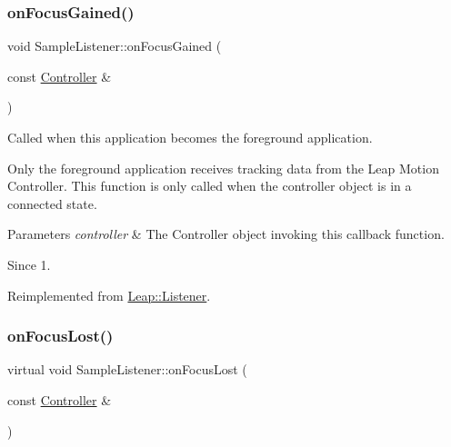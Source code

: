 \subsubsection{\texorpdfstring{on\+Focus\+Gained()}{onFocusGained()}\hspace{0.1cm}{\footnotesize\ttfamily [2/2]}}
{\footnotesize\ttfamily void Sample\+Listener\+::on\+Focus\+Gained (\begin{DoxyParamCaption}\item[{const \hyperlink{class_leap_1_1_controller}{Controller} \&}]{ }\end{DoxyParamCaption})\hspace{0.3cm}{\ttfamily [virtual]}}

Called when this application becomes the foreground application.

Only the foreground application receives tracking data from the Leap Motion Controller. This function is only called when the controller object is in a connected state.


\begin{DoxyCodeInclude}
\end{DoxyCodeInclude}



\begin{DoxyParams}{Parameters}
{\em controller} & The Controller object invoking this callback function. \\
\hline
\end{DoxyParams}
\begin{DoxySince}{Since}
1. 
\end{DoxySince}


Reimplemented from \hyperlink{class_leap_1_1_listener_ab52aa99ad9e8fd0f35d9dffc3ef9f027}{Leap\+::\+Listener}.

\mbox{\label{class_sample_listener_a9510c508c13ed2ce6afe224dca483e0b}} 
\subsubsection{\texorpdfstring{on\+Focus\+Lost()}{onFocusLost()}\hspace{0.1cm}{\footnotesize\ttfamily [1/2]}}
{\footnotesize\ttfamily virtual void Sample\+Listener\+::on\+Focus\+Lost (\begin{DoxyParamCaption}\item[{const \hyperlink{class_leap_1_1_controller}{Controller} \&}]{ }\end{DoxyParamCaption})\hspace{0.3cm}{\ttfamily [virtual]}}

